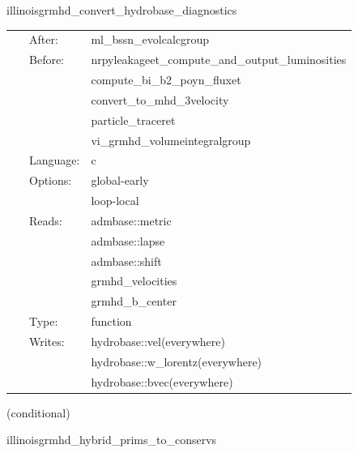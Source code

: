 \documentclass{article}
\begin{document}
\hspace{5mm} illinoisgrmhd\_convert\_hydrobase\_diagnostics 

\hspace{5mm}{\it convert illinoisgrmhd-native variables to hydrobase } 


\hspace{5mm}

 \begin{tabular*}{160mm}{cll} 
~ & After:  & ml\_bssn\_evolcalcgroup \\ 
~ & Before:  & nrpyleakageet\_compute\_and\_output\_luminosities \\ 
~& ~ &compute\_bi\_b2\_poyn\_fluxet\\ 
~& ~ &convert\_to\_mhd\_3velocity\\ 
~& ~ &particle\_traceret\\ 
~& ~ &vi\_grmhd\_volumeintegralgroup\\ 
~ & Language:  & c \\ 
~ & Options:  & global-early \\ 
~& ~ &loop-local\\ 
~ & Reads:  & admbase::metric \\ 
~& ~ &admbase::lapse\\ 
~& ~ &admbase::shift\\ 
~& ~ &grmhd\_velocities\\ 
~& ~ &grmhd\_b\_center\\ 
~ & Type:  & function \\ 
~ & Writes:  & hydrobase::vel(everywhere) \\ 
~& ~ &hydrobase::w\_lorentz(everywhere)\\ 
~& ~ &hydrobase::bvec(everywhere)\\ 
\end{tabular*} 


\vspace{5mm}

   (conditional) 

\hspace{5mm} illinoisgrmhd\_hybrid\_prims\_to\_conservs 

\hspace{5mm}{\it hybrid version of illinoisgrmhd\_prims\_to\_conservs } 


\hspace{5mm}
\end{document}
